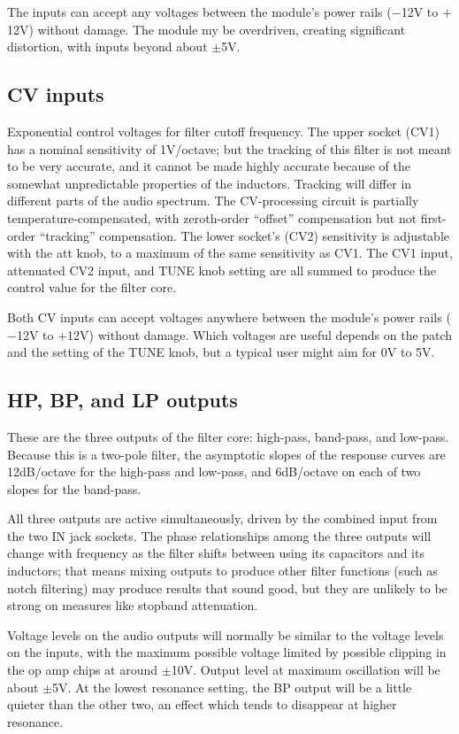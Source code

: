 The inputs can accept any voltages between the module's power rails ($-$12V
to $+$12V) without damage.  The module my be overdriven, creating
significant distortion, with inputs beyond about $\pm$5V.

\subsection{CV inputs}

Exponential control voltages for filter cutoff frequency.  The upper socket
(CV1) has a nominal sensitivity of 1V/octave; but the tracking of this
filter is not meant to be very accurate, and it cannot be made highly
accurate because of the somewhat unpredictable properties of the inductors. 
Tracking will differ in different parts of the audio spectrum.  The
CV-processing circuit is partially temperature-compensated, with
zeroth-order ``offset'' compensation but not first-order ``tracking''
compensation.  The lower socket's (CV2) sensitivity is adjustable with the
att knob, to a maximum of the same sensitivity as CV1.  The CV1 input,
attenuated CV2 input, and TUNE knob setting are all summed to produce the
control value for the filter core.

Both CV inputs can accept voltages anywhere between the module's power rails
($-$12V to $+$12V) without damage.  Which voltages are useful depends on the
patch and the setting of the TUNE knob, but a typical user might aim for 0V
to 5V.

\subsection{HP, BP, and LP outputs}

These are the three outputs of the filter core:  high-pass, band-pass, and
low-pass.  Because this is a two-pole filter, the asymptotic slopes of the
response curves are 12dB/octave for the high-pass and low-pass, and
6dB/octave on each of two slopes for the band-pass.

All three outputs are active simultaneously, driven by the combined input
from the two IN jack sockets.  The phase relationships among the three
outputs will change with frequency as the filter shifts between using its
capacitors and its inductors; that means mixing outputs to produce other
filter functions (such as notch filtering) may produce results that sound
good, but they are unlikely to be strong on measures like stopband
attenuation.

Voltage levels on the audio outputs will normally be similar to the voltage
levels on the inputs, with the maximum possible voltage limited by possible
clipping in the op amp chips at around $\pm$10V.  Output level at maximum
oscillation will be about $\pm$5V.  At the lowest resonance setting, the BP
output will be a little quieter than the other two, an effect which tends to
disappear at higher resonance.

